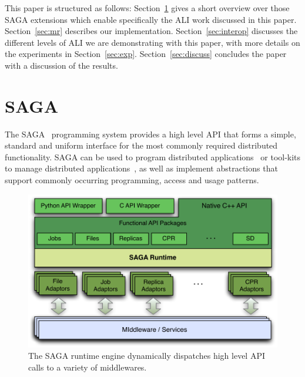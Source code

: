 \documentclass[3p,twocolumn]{elsarticle}
\begin{document}

This paper is structured as follows: Section~\ref{sec:saga} gives a
short overview over those SAGA extensions which enable specifically
the ALI work discussed in this paper.  Section~\ref{sec:mr} describes
our \smr implementation.  Section~\ref{sec:interop} discusses the
different levels of ALI we are demonstrating with this paper, with
more details on the experiments in Section~\ref{sec:exp}.
Section~\ref{sec:discuss} concludes the paper with a discussion of the
results.








\section{SAGA}
\label{sec:saga}

The SAGA~\cite{saga-core, Kaiser:2006qp} programming system provides a
high level API that forms a simple, standard and uniform interface for
the most commonly required distributed functionality.  SAGA can be
used to program distributed applications~\cite{saga_escience07,
saga_tg08} or tool-kits to manage distributed
applications~\cite{Luckow:2008xy}, as well as implement abstractions
that support commonly occurring programming, access and usage
patterns.

\begin{figure}[t]
 \includegraphics[scale=0.5]{saga-figure02.pdf}
 \caption{The SAGA runtime engine dynamically dispatches high level
          API calls to a variety of middlewares.}
 \label{fig:saga}
\end{figure}
\end{document}
